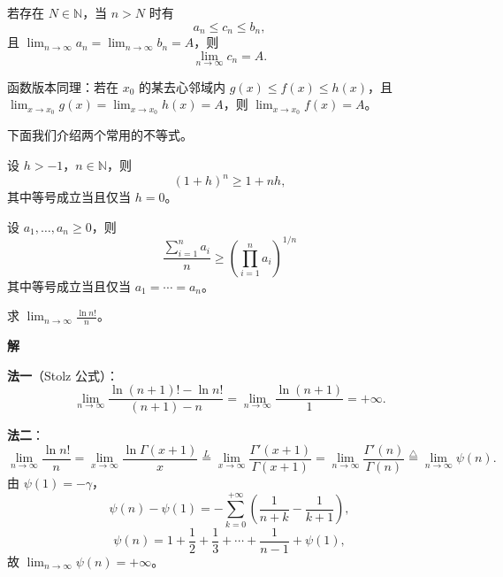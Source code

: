 \documentclass[lang=cn,chinesefont=founder,10pt]{elegantbook}
\renewenvironment{proof}[1][\proofname]{
  \par\noindent\textbf{\color{second}#1\;}\par\noindent
  \color{black!90}\cfs}{
  \par}
\begin{document}
\begin{theorem}[夹逼准则]
    若存在 $N \in \mathbb{N}$，当 $n > N$ 时有
    \[
        a_n \leq c_n \leq b_n,
    \]
    且 $\displaystyle\lim_{n \to \infty} a_n = \lim_{n \to \infty} b_n = A$，则
    \[
        \lim_{n \to \infty} c_n = A.
    \]
\end{theorem}

\begin{remark}
    函数版本同理：若在 $x_0$ 的某去心邻域内 $g(x) \leq f(x) \leq h(x)$，且 $\displaystyle\lim_{x \to x_0} g(x) = \displaystyle\lim_{x \to x_0} h(x) = A$，则 $\displaystyle\lim_{x \to x_0} f(x) = A$。
\end{remark}

下面我们介绍两个常用的不等式。

\begin{theorem}
    设 $h > -1$，$n \in \mathbb{N}$，则
    \[
        (1 + h)^n \geq 1 + nh,
    \]
    其中等号成立当且仅当 $ h = 0$。
\end{theorem}

\begin{theorem}[算术--几何平均不等式]
    设 $a_1, \ldots, a_n \geq 0$，则
    \[
        \frac{\displaystyle\sum_{i=1}^{n} a_i}{n} \geq \left(\prod_{i=1}^{n} a_i\right)^{1/n}
    \]
    其中等号成立当且仅当 $ a_1 = \cdots = a_n$。
\end{theorem}

\begin{example}
    求 $\displaystyle\lim_{n \to \infty} \frac{\ln n!}{n}$。
\end{example}

\begin{proof}[解]
    \textbf{法一}（Stolz 公式）：
    \[
        \lim_{n \to \infty} \frac{\ln(n+1)! - \ln n!}{(n+1) - n}
        = \lim_{n \to \infty} \frac{\ln(n+1)}{1}
        = +\infty.
    \]

    \textbf{法二}：
    \[
        \lim_{n \to \infty} \frac{\ln n!}{n}
        = \lim_{x \to \infty} \frac{\ln \Gamma(x+1)}{x}
        \stackrel{L}{=} \lim_{x \to \infty} \frac{\Gamma'(x+1)}{\Gamma(x+1)}
        = \lim_{n \to \infty} \frac{\Gamma'(n)}{\Gamma(n)}
        \stackrel{\triangle}{=} \lim_{n \to \infty} \psi(n).
    \]
    由 $\psi(1) = -\gamma$，
    \[
        \psi(n) - \psi(1) = -\sum_{k=0}^{+\infty} \left(\frac{1}{n+k} - \frac{1}{k+1}\right),
    \]
    \[
        \psi(n) = 1 + \frac{1}{2} + \frac{1}{3} + \cdots + \frac{1}{n-1} + \psi(1),
    \]
    故 $\displaystyle\lim_{n \to \infty} \psi(n) = +\infty$。
\end{proof}
\end{document}
